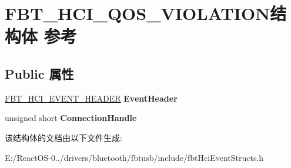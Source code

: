 \hypertarget{struct_f_b_t___h_c_i___q_o_s___v_i_o_l_a_t_i_o_n}{}\section{F\+B\+T\+\_\+\+H\+C\+I\+\_\+\+Q\+O\+S\+\_\+\+V\+I\+O\+L\+A\+T\+I\+O\+N结构体 参考}
\label{struct_f_b_t___h_c_i___q_o_s___v_i_o_l_a_t_i_o_n}
\subsection*{Public 属性}
\begin{DoxyCompactItemize}
\item 
\mbox{\label{struct_f_b_t___h_c_i___q_o_s___v_i_o_l_a_t_i_o_n_a47f8f03f5350fb43aa8c2e3d5552318c}} 
\hyperlink{struct_f_b_t___h_c_i___e_v_e_n_t___h_e_a_d_e_r}{F\+B\+T\+\_\+\+H\+C\+I\+\_\+\+E\+V\+E\+N\+T\+\_\+\+H\+E\+A\+D\+ER} {\bfseries Event\+Header}
\item 
\mbox{\label{struct_f_b_t___h_c_i___q_o_s___v_i_o_l_a_t_i_o_n_a4e5872e65563ae326f7e496c85de20fe}} 
unsigned short {\bfseries Connection\+Handle}
\end{DoxyCompactItemize}


该结构体的文档由以下文件生成\+:\begin{DoxyCompactItemize}
\item 
E\+:/\+React\+O\+S-\/0../drivers/bluetooth/fbtusb/include/fbt\+Hci\+Event\+Structs.\+h\end{DoxyCompactItemize}
